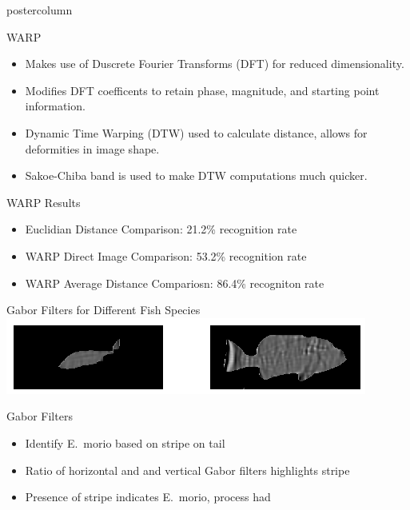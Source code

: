 \documentclass[final]{beamer}
\begin{document}
\begin{frame}
\begin{columns}
\begin{column}{.33\textwidth}
\begin{beamercolorbox}[center,wd=\textwidth]{postercolumn}
\begin{minipage}[T]{.95\textwidth}
{            \begin{block}{WARP}
	      \begin{itemize}
              \item Makes use of Duscrete Fourier Transforms (DFT) for reduced dimensionality.
	      \item Modifies DFT coefficents to retain phase, magnitude, and starting point information.
	      \item Dynamic Time Warping (DTW) used to calculate distance, allows for deformities in image shape.
	      \item Sakoe-Chiba band is used to make DTW computations much quicker.
	      \end{itemize}
            \end{block}
            \vfill
            \begin{block}{WARP Results}
              \begin{itemize}
	      \item Euclidian Distance Comparison: 21.2\% recognition rate
              \item WARP Direct Image Comparison: 53.2\% recognition rate
              \item WARP Average Distance Compariosn: 86.4\% recogniton rate
              \end{itemize}              
            \end{block}
            \vfill
            \begin{block}{Gabor Filters for Different Fish Species}
              \centering
              \includegraphics[width=.95\linewidth]{figures/Gabor}
            \end{block}
            \vfill
            \begin{block}{Gabor Filters}
              \begin{itemize}
              \item Identify E.~morio based on stripe on tail
              \item Ratio of horizontal and and vertical Gabor filters highlights stripe
              \item Presence of stripe indicates E.~morio, process had 
              \end{itemize}              

\end{block}}
\end{minipage}
\end{beamercolorbox}
\end{column}
\end{columns}
\end{frame}
\end{document}
